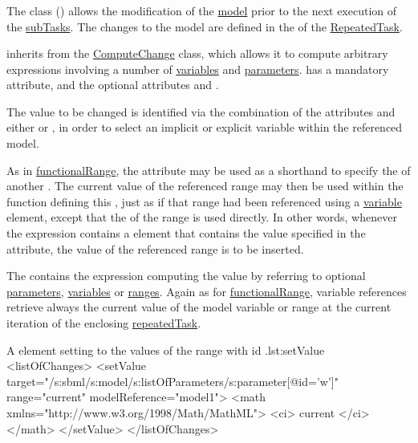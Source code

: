 \subsubsection{}
\label{class:setValue}
The  class () allows the modification of the \hyperref[class:model]{model} prior to the next execution of the \hyperref[class:subTask]{subTasks}. The changes to the model are defined in the \hyperref[sec:changesRepeatedTask]{} of the \hyperref[class:repeatedTask]{RepeatedTask}.

 inherits from the \hyperref[class:computeChange]{ComputeChange} class, which allows it to compute arbitrary expressions involving a number of \hyperref[class:variable]{variables} and \hyperref[class:parameter]{parameters}.  has a mandatory  attribute, and the optional attributes  and .

The value to be changed is identified via the combination of the attributes  and either  or , in order to select an implicit or explicit variable within the referenced model.

As in \hyperref[class:functionalRange]{functionalRange}, the attribute  may be used as a shorthand to specify the  of another . The current value of the referenced range may then be used within the function defining this , just as if that range had been referenced using a \hyperref[class:variable]{variable} element, except that the  of the range is used directly. In other words, whenever the expression contains a  element that contains the value specified in the  attribute, the value of the referenced range is to be inserted.

The \hyperref[sec:math]{} contains the expression computing the value by referring to optional \hyperref[class:parameter]{parameters}, \hyperref[class:variable]{variables} or \hyperref[class:range]{ranges}.
Again as for \hyperref[class:functionalRange]{functionalRange}, variable references retrieve always the current value of the model variable or range at the current iteration of the enclosing \hyperref[class:repeatedTask]{repeatedTask}.

\begin{myXmlLst}{A  element setting  to the values of the range with id .}{lst:setValue}
<listOfChanges>
	<setValue target="/s:sbml/s:model/s:listOfParameters/s:parameter[@id='w']"
		range="current" modelReference="model1">
		<math xmlns="http://www.w3.org/1998/Math/MathML">
			<ci> current </ci>
		</math>
	</setValue>
</listOfChanges>
\end{myXmlLst}

